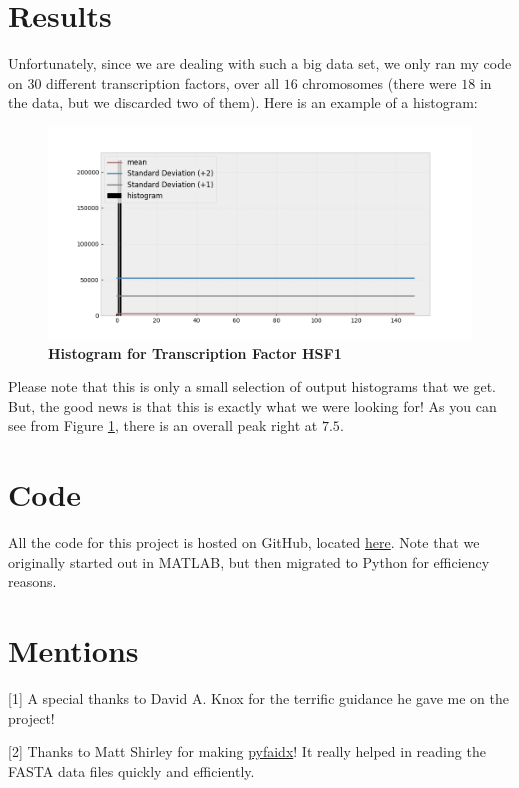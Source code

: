 \documentclass{article}
\begin{document}
\section{Results}
Unfortunately, since we are dealing with such a big data set, we only ran my code on $30$ different transcription factors, over all $16$ chromosomes (there were $18$ in the data, but we discarded two of them). Here is an example of a histogram:
\begin{figure}[H]
  \centering
  \includegraphics[scale=0.29]{HistHSF1.png}
  \caption{\textbf{Histogram for Transcription Factor HSF1}}
  \label{fig:histhsf1}
\end{figure}
Please note that this is only a small selection of output histograms that we get. But, the good news is that this is exactly what we were looking for! As you can see from Figure \ref{fig:histhsf1}, there is an overall peak right at $7.5$.
\section{Code}
All the code for this project is hosted on GitHub, located \href{https://github.com/johnletey/A-Study-of-Transcription-and-Its-Affects}{here}. Note that we originally started out in MATLAB, but then migrated to Python for efficiency reasons.
\section{Mentions}
\small

[1] A special thanks to David A. Knox for the terrific guidance he gave me on the project!

[2] Thanks to Matt Shirley for making \href{https://github.com/mdshw5/pyfaidx}{pyfaidx}! It really helped in reading the FASTA data files quickly and efficiently.
\end{document}
